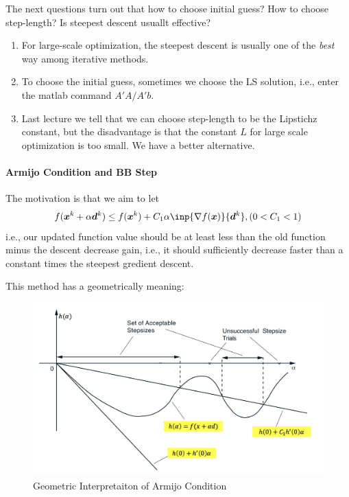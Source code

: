 The next questions turn out that how to choose initial guess? How to choose step-length? Is steepest descent usuallt effective?
\begin{enumerate}
\item
For large-scale optimization, the steepest descent is usually one of the \emph{best} way among iterative methods.
\item
To choose the initial guess, sometimes we choose the LS solution, i.e., enter the matlab command $A'A/A'b$.
\item
Last lecture we tell that we can choose step-length to be the Lipstichz constant, but the disadvantage is that the constant $L$ for large scale optimization is too small. We have a better alternative.
\end{enumerate}

\paragraph{Armijo Condition and BB Step}The motivation is that we aim to let
\begin{equation}\label{Eq:3:2}
f(\bm x^k+\alpha\bm d^k)\le f(\bm x^k)+C_1\alpha \inp{\nabla f(\bm x)}{\bm d^k}, (0<C_1<1)
\end{equation}
i.e., our updated function value should be at least less than the old function minus the descent decrease gain, i.e., it should sufficiently decrease faster than a constant times the steepest gredient descent.

This method has a geometrically meaning:
\begin{figure}[H]
\centering
\includegraphics[width=15cm]{3_1.png}
\caption{Geometric Interpretaiton of Armijo Condition}
\end{figure}

